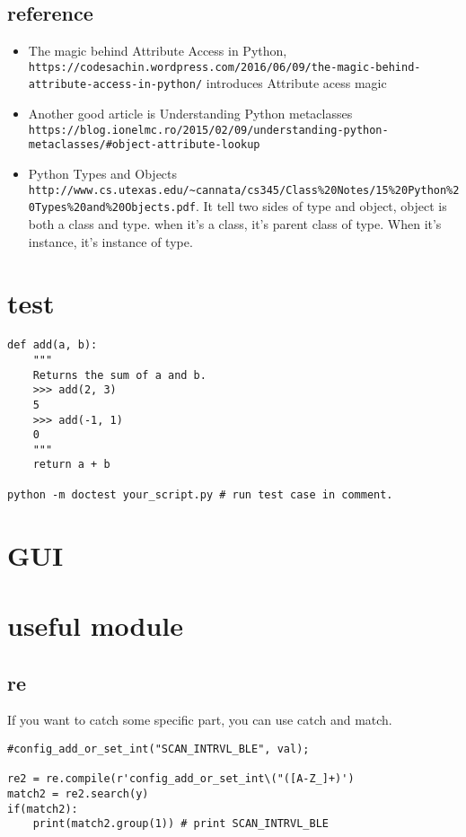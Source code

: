 \documentclass[a4paper,12pt,twoside]{book}
\begin{document}
\section{reference}
\begin{itemize}
	\item The magic behind Attribute Access in Python, \verb|https://codesachin.wordpress.com/2016/06/09/the-magic-behind-attribute-access-in-python/|
	introduces Attribute acess magic
	\item Another good article is  Understanding Python metaclasses \verb|https://blog.ionelmc.ro/2015/02/09/understanding-python-metaclasses/#object-attribute-lookup|
	\item Python Types and Objects \verb|http://www.cs.utexas.edu/~cannata/cs345/Class%20Notes/15%20Python%20Types%20and%20Objects.pdf|. It tell two sides of type and object,  object is both a class and type. when it's a class, it's parent class of type. When it's instance, it's instance of type. 
\end{itemize}

\chapter{test}
\begin{lstlisting}
def add(a, b):
	"""
	Returns the sum of a and b.
	>>> add(2, 3)
	5
	>>> add(-1, 1)
	0
	"""
	return a + b
	
python -m doctest your_script.py # run test case in comment.
\end{lstlisting}

\chapter{GUI}

\chapter{useful module}
\section{re}
If you want to catch some specific part, you can use catch and match. 
\begin{lstlisting}
#config_add_or_set_int("SCAN_INTRVL_BLE", val);

re2 = re.compile(r'config_add_or_set_int\("([A-Z_]+)')
match2 = re2.search(y)
if(match2):
	print(match2.group(1)) # print SCAN_INTRVL_BLE
\end{lstlisting}
\end{document}
